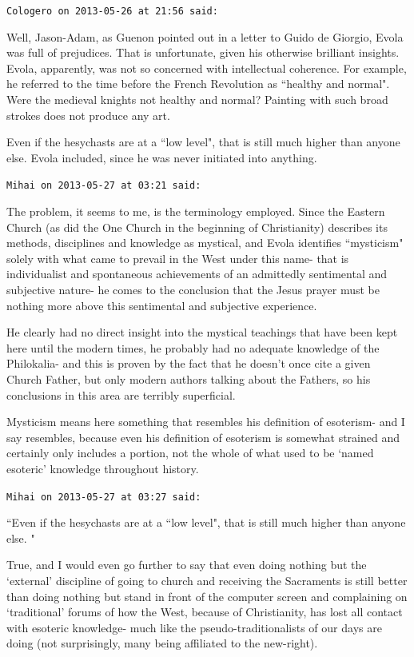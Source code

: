 \begin{footnotesize}
\begin{sffamily}
\hfill

\texttt{Cologero on 2013-05-26 at 21:56 said: }

Well, Jason-Adam, as Guenon pointed out in a letter to Guido de Giorgio, Evola was full of prejudices. That is unfortunate, given his otherwise brilliant insights. Evola, apparently, was not so concerned with intellectual coherence. For example, he referred to the time before the French Revolution as ``healthy and normal". Were the medieval knights not healthy and normal? Painting with such broad strokes does not produce any art.

Even if the hesychasts are at a ``low level", that is still much higher than anyone else. Evola included, since he was never initiated into anything.


\hfill

\texttt{Mihai on 2013-05-27 at 03:21 said: }

The problem, it seems to me, is the terminology employed. Since the Eastern Church (as did the One Church in the beginning of Christianity) describes its methods, disciplines and knowledge as mystical, and Evola identifies ``mysticism" solely with what came to prevail in the West under this name- that is individualist and spontaneous achievements of an admittedly sentimental and subjective nature- he comes to the conclusion that the Jesus prayer must be nothing more above this sentimental and subjective experience.

He clearly had no direct insight into the mystical teachings that have been kept here until the modern times, he probably had no adequate knowledge of the Philokalia- and this is proven by the fact that he doesn't once cite a given Church Father, but only modern authors talking about the Fathers, so his conclusions in this area are terribly superficial. 

Mysticism means here something that resembles his definition of esoterism- and I say resembles, because even his definition of esoterism is somewhat strained and certainly only includes a portion, not the whole of what used to be `named esoteric' knowledge throughout history.


\hfill

\texttt{Mihai on 2013-05-27 at 03:27 said: }

``Even if the hesychasts are at a ``low level", that is still much higher than anyone else. "

True, and I would even go further to say that even doing nothing but the `external' discipline of going to church and receiving the Sacraments is still better than doing nothing but stand in front of the computer screen and complaining on `traditional' forums of how the West, because of Christianity, has lost all contact with esoteric knowledge- much like the pseudo-traditionalists of our days are doing (not surprisingly, many being affiliated to the new-right).



\end{sffamily}
\end{footnotesize}
